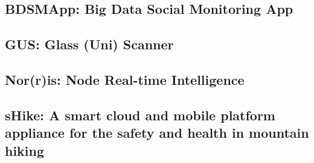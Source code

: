 \subsection{BDSMApp: Big Data Social Monitoring App}

\newpage
\subsection{GUS: Glass (Uni) Scanner }

\newpage
\subsection{Nor(r)is: Node Real-time Intelligence}

\newpage
\subsection{sHike: A smart cloud and mobile platform appliance for the safety and health in mountain hiking}


